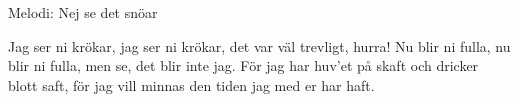 \begin{song}

\begin{songmeta}
Melodi: Nej se det snöar
\end{songmeta}

\begin{songtext}
Jag ser ni krökar, jag ser ni krökar,
det var väl trevligt, hurra!
Nu blir ni fulla, nu blir ni fulla,
men se, det blir inte jag.
För jag har huv'et på skaft
och dricker blott saft,
för jag vill minnas den tiden
jag med er har haft.

\end{songtext}
\end{song}
